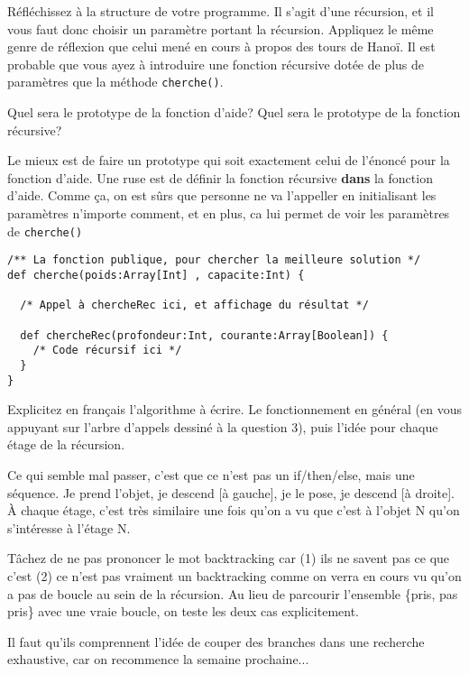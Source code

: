\documentclass[10pt]{article}\usepackage[correction,nu]{esial}
\begin{document}
\medskip Réfléchissez à la structure de votre programme. Il s'agit d'une
récursion, et il vous faut donc choisir un paramètre portant la
récursion. Appliquez le même genre de réflexion que celui mené en cours à
propos des tours de Hanoï. Il est probable que vous ayez à introduire une
fonction récursive dotée de plus de paramètres que la méthode
\texttt{cherche()}.

\Question Quel sera le prototype de la fonction d'aide? Quel sera le prototype
de la fonction récursive?

\begin{Reponse}
  Le mieux est de faire un prototype qui soit exactement celui de l'énoncé pour
  la fonction d'aide. Une ruse est de définir la fonction récursive
  \textbf{dans} la fonction d'aide. Comme ça, on est sûrs que personne ne va
  l'appeller en initialisant les paramètres n'importe comment, et en plus, ca
  lui permet de voir les paramètres de \texttt{cherche()}
  \begin{Verbatim}
/** La fonction publique, pour chercher la meilleure solution */
def cherche(poids:Array[Int] , capacite:Int) {

  /* Appel à chercheRec ici, et affichage du résultat */
  
  def chercheRec(profondeur:Int, courante:Array[Boolean]) {
    /* Code récursif ici */
  }
}    
  \end{Verbatim}
\end{Reponse}

\Question Explicitez en français l'algorithme à écrire. Le fonctionnement en
général (en vous appuyant sur l'arbre d'appels dessiné à la question 3), puis
l'idée pour chaque étage de la récursion.

\begin{Reponse}
  Ce qui semble mal passer, c'est que ce n'est pas un if/then/else, mais une
  séquence. Je prend l'objet, je descend [à gauche], je le pose, je descend [à
  droite]. À chaque étage, c'est très similaire une fois qu'on a vu que c'est
  à  l'objet N qu'on s'intéresse à l'étage N.

  Tâchez de ne pas prononcer le mot backtracking car (1) ils ne savent pas ce
  que c'est (2) ce n'est pas vraiment un backtracking comme on verra en cours vu
  qu'on a pas de boucle au sein de la récursion. Au lieu de parcourir l'ensemble
  \{pris, pas pris\} avec une vraie boucle, on teste les deux cas explicitement.

  Il faut qu'ils comprennent l'idée de couper des branches dans une recherche
  exhaustive, car on recommence la semaine prochaine...
\end{Reponse}
\end{document}
